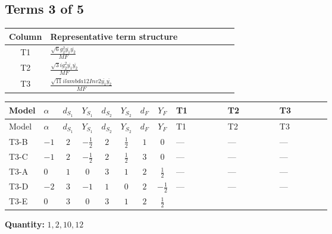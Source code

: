 \documentclass[8pt]{article}
\begin{document}
\begin{landscape}
\subsection*{Terms 3 of 5}
\begin{center}
\begin{tabular}{@{}c >{\raggedright\arraybackslash}p{0.82\linewidth}@{}}
\toprule
Column & Representative term structure \\
\midrule
T1 & \(\displaystyle \frac{\sqrt{6} g_{2}^{2} \overline{y_{1}} \overline{y_{2}}}{MF}\) \\
\midrule
T2 & \(\displaystyle \frac{\sqrt{3} i g_{2}^{2} \overline{y_{1}} \overline{y_{2}}}{MF}\) \\
\midrule
T3 & \(\displaystyle \frac{\sqrt{11} i lambda12Inv2 \overline{y_{1}} \overline{y_{2}}}{MF}\) \\
\midrule
\bottomrule
\end{tabular}
\end{center}
\smallskip
\tiny
\begin{longtable}{@{}llcccccc >{\raggedright\arraybackslash}p{0.21\linewidth} >{\raggedright\arraybackslash}p{0.21\linewidth} >{\raggedright\arraybackslash}p{0.21\linewidth}@{}}
\toprule
Model & $\alpha$ & $d_{S_1}$ & $Y_{S_1}$ & $d_{S_2}$ & $Y_{S_2}$ & $d_F$ & $Y_F$ & T1 & T2 & T3 \\
\midrule
\endfirsthead
\toprule
Model & $\alpha$ & $d_{S_1}$ & $Y_{S_1}$ & $d_{S_2}$ & $Y_{S_2}$ & $d_F$ & $Y_F$ & T1 & T2 & T3 \\
\midrule
\endhead
T3-B & $-1$ & $2$ & $-\frac{1}{2}$ & $2$ & $\frac{1}{2}$ & $1$ & $0$ & --- & --- & --- \\
\midrule
T3-C & $-1$ & $2$ & $-\frac{1}{2}$ & $2$ & $\frac{1}{2}$ & $3$ & $0$ & --- & --- & --- \\
\midrule
T3-A & $0$ & $1$ & $0$ & $3$ & $1$ & $2$ & $\frac{1}{2}$ & --- & --- & --- \\
\midrule
T3-D & $-2$ & $3$ & $-1$ & $1$ & $0$ & $2$ & $-\frac{1}{2}$ & --- & --- & --- \\
\midrule
T3-E & $0$ & $3$ & $0$ & $3$ & $1$ & $2$ & $\frac{1}{2}$ & \scriptsize\adjustbox{max width=\linewidth}{$\begin{gathered} - \frac{\sqrt{6} g_{2}^{2} \overline{y_{1}} \overline{y_{2}}}{6 MF}\end{gathered}$} & \scriptsize\adjustbox{max width=\linewidth}{$\begin{gathered} - \frac{15 \sqrt{3} i g_{2}^{2} \overline{y_{1}} \overline{y_{2}}}{8 MF}\end{gathered}$} & \scriptsize\adjustbox{max width=\linewidth}{$\begin{gathered} - \frac{3 \sqrt{11} i lambda12Inv2 \overline{y_{1}} \overline{y_{2}}}{22 MF}\end{gathered}$} \\
\midrule
\bottomrule
\end{longtable}
\clearpage
\noindent\textbf{Quantity: }$\mathrm{1,2,10,12}$\par\smallskip

\end{landscape}
\end{document}
